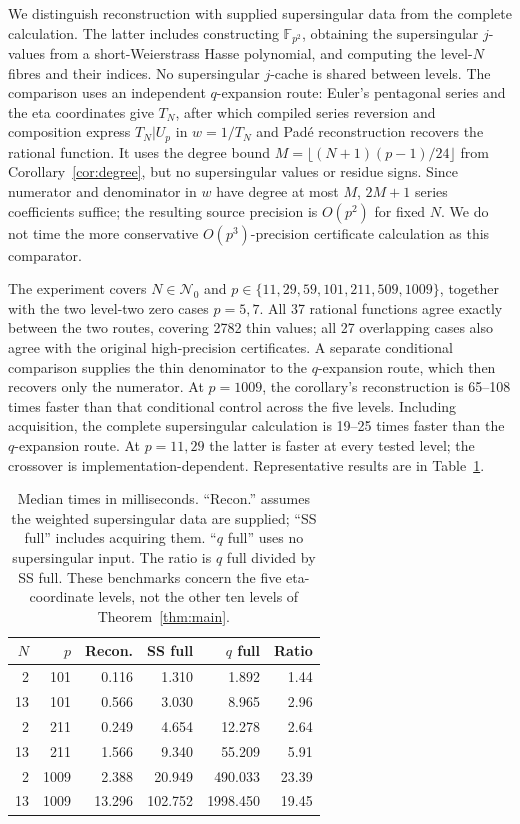 \documentclass[11pt,a4paper]{article}
\numberwithin{equation}{section}
\theoremstyle{definition}
\theoremstyle{remark}
\newcommand{\Fq}{\mathbb F_{p^2}}
\begin{document}
We distinguish reconstruction with supplied supersingular data from the complete
calculation. The latter includes constructing $\Fq$, obtaining the supersingular
$j$-values from a short-Weierstrass Hasse polynomial, and computing the level-$N$
fibres and their indices. No supersingular $j$-cache is shared between levels.
The comparison uses an independent $q$-expansion route: Euler's pentagonal
series and the eta coordinates give $T_N$, after which compiled series reversion
and composition express $T_N|U_p$ in $w=1/T_N$ and Pad\'e reconstruction
recovers the rational function. It uses the degree bound
$M=\lfloor(N+1)(p-1)/24\rfloor$ from Corollary~\ref{cor:degree}, but no
supersingular values or residue signs. Since numerator and denominator in $w$
have degree at most $M$, $2M+1$ series coefficients suffice; the resulting
source precision is $O(p^2)$ for fixed $N$. We do not time the more conservative
$O(p^3)$-precision certificate calculation as this comparator.

The experiment covers $N\in\mathcal N_0$ and
$p\in\{11,29,59,101,211,509,1009\}$, together with the two level-two zero
cases $p=5,7$. All 37 rational functions agree exactly between the two routes,
covering 2782 thin values; all 27 overlapping cases also agree with the
original high-precision certificates. A separate conditional comparison supplies
the thin denominator to the $q$-expansion route, which then recovers only the
numerator. At $p=1009$, the corollary's reconstruction is 65--108 times faster
than that conditional control across the five levels. Including acquisition,
the complete supersingular calculation is 19--25 times faster than the
$q$-expansion route. At $p=11,29$ the latter is faster at every tested level;
the crossover is implementation-dependent. Representative results are in
Table~\ref{tab:reconstruction-timings}.

\begin{table}[htbp]\centering\small
\begin{tabular}{rrrrrr}\toprule
$N$&$p$&Recon.&SS full&$q$ full&Ratio\\\midrule
2&101&0.116&1.310&1.892&1.44\\
13&101&0.566&3.030&8.965&2.96\\
2&211&0.249&4.654&12.278&2.64\\
13&211&1.566&9.340&55.209&5.91\\
2&1009&2.388&20.949&490.033&23.39\\
13&1009&13.296&102.752&1998.450&19.45\\
\bottomrule\end{tabular}
\caption{Median times in milliseconds. ``Recon.'' assumes the weighted
supersingular data are supplied; ``SS full'' includes acquiring them.
``$q$ full'' uses no supersingular input. The ratio is $q$ full divided by
SS full. These benchmarks concern the five eta-coordinate levels, not the
other ten levels of Theorem~\ref{thm:main}.}
\label{tab:reconstruction-timings}
\end{table}
\end{document}
